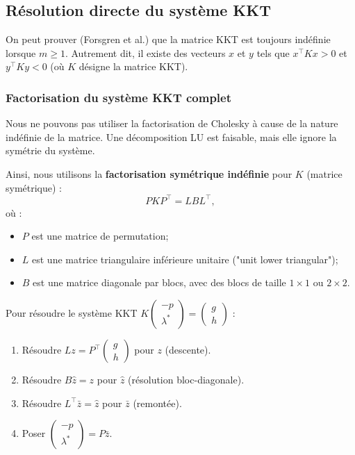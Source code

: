 \subsection{Résolution directe du système KKT}

\begin{remarque}
    On peut prouver (Forsgren et al.) que la matrice KKT est toujours indéfinie lorsque $m \ge 1$. Autrement dit, il existe des vecteurs $x$ et $y$ tels que $x^\top K x > 0$ et $y^\top K y < 0$ (où $K$ désigne la matrice KKT).
\end{remarque}

\subsubsection{Factorisation du système KKT complet}

Nous ne pouvons pas utiliser la factorisation de Cholesky à cause de la nature indéfinie de la matrice.
Une décomposition LU est faisable, mais elle ignore la symétrie du système.

Ainsi, nous utilisons la \textbf{factorisation symétrique indéfinie} pour $K$ (matrice symétrique) :
\begin{equation}
    P K P^\top = L B L^\top,
\end{equation}
où :
\begin{itemize}
    \item $P$ est une matrice de permutation;
    \item $L$ est une matrice triangulaire inférieure unitaire ("unit lower triangular");
    \item $B$ est une matrice diagonale par blocs, avec des blocs de taille $1 \times 1$ ou $2 \times 2$.
\end{itemize}

Pour résoudre le système KKT $K \begin{pmatrix} -p \\ \lambda^* \end{pmatrix} = \begin{pmatrix} g \\ h \end{pmatrix}$ :
\begin{enumerate}
    \item Résoudre $Lz = P^\top \begin{pmatrix} g \\ h \end{pmatrix}$ pour $z$ (descente).
    \item Résoudre $B\hat{z} = z$ pour $\hat{z}$ (résolution bloc-diagonale).
    \item Résoudre $L^\top \bar{z} = \hat{z}$ pour $\bar{z}$ (remontée).
    \item Poser $\begin{pmatrix} -p \\ \lambda^* \end{pmatrix} = P \bar{z}$.
\end{enumerate}

